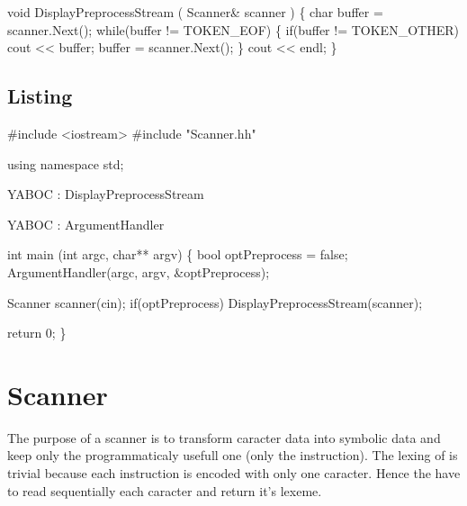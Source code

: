 \nwenddocs{}\endmoddef\nwstartdeflinemarkup\nwenddeflinemarkup
void DisplayPreprocessStream ( Scanner& scanner ) \{
        char buffer = scanner.Next();
        while(buffer != TOKEN_EOF) \{
                if(buffer != TOKEN_OTHER) cout << buffer;
                buffer = scanner.Next();
        \}
        cout << endl;
\}
\nwendcode{}\nwdocspar

\subsection{Listing}
\nwenddocs{}\endmoddef\nwstartdeflinemarkup\nwenddeflinemarkup
#include <iostream>
#include "Scanner.hh"

using namespace std;

\LA{}YABOC : DisplayPreprocessStream\RA{}

\LA{}YABOC : ArgumentHandler\RA{}

int main (int argc, char** argv) \{
        bool optPreprocess = false;
        ArgumentHandler(argc, argv, &optPreprocess);    

        Scanner scanner(cin);
        if(optPreprocess) DisplayPreprocessStream(scanner);

        return 0;
\}
\nwendcode{}\nwdocspar

\nwenddocs{}\endmoddef\nwstartdeflinemarkup\nwenddeflinemarkup
\nwendcode{}\nwdocspar
\nwenddocs{}\section{Scanner}
The purpose of a scanner is to transform caracter data into symbolic data and keep only the programmaticaly usefull one (\ie only the instruction). The lexing of \brainfuck is trivial because each instruction is encoded with only one caracter. Hence the  have to read sequentially each caracter and return it's \gls{lexeme}.

